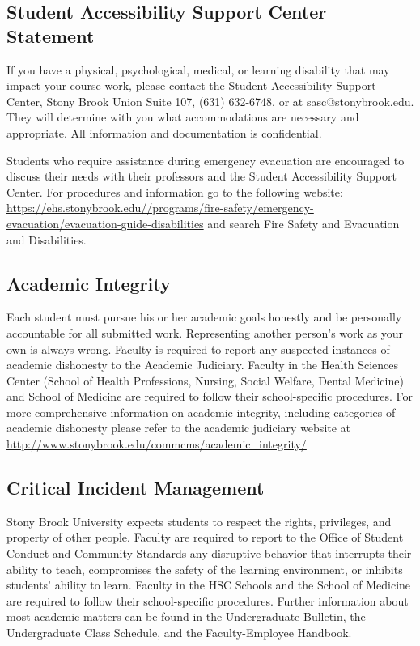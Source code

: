\documentclass[10pt]{article}
\begin{document}
\subsection*{Student Accessibility Support Center Statement}

If you have a physical, psychological, medical, or learning disability
that may impact your course work, please contact the Student
Accessibility Support Center, Stony Brook Union Suite 107, (631)
632-6748, or at sasc@stonybrook.edu. They will determine with you what
accommodations are necessary and appropriate. All information and
documentation is confidential.

Students who require assistance during emergency evacuation are
encouraged to discuss their needs with their professors and the
Student Accessibility Support Center. For procedures and information
go to the following website:\\
{\small \url{https://ehs.stonybrook.edu//programs/fire-safety/emergency-evacuation/evacuation-guide-disabilities}}\linebreak
and search Fire Safety and Evacuation and Disabilities.


\subsection*{Academic Integrity}

Each student must pursue his or her academic goals honestly and be
personally accountable for all submitted work. Representing another
person's work as your own is always wrong. Faculty is required to
report any suspected instances of academic dishonesty to the Academic
Judiciary. Faculty in the Health Sciences Center (School of Health
Professions, Nursing, Social Welfare, Dental Medicine) and School of
Medicine are required to follow their school-specific procedures. For
more comprehensive information on academic integrity, including
categories of academic dishonesty please refer to the academic
judiciary website at\\
{\small \url{http://www.stonybrook.edu/commcms/academic\_integrity/}}


\subsection*{Critical Incident Management}

Stony Brook University expects students to respect the rights,
privileges, and property of other people. Faculty are required to
report to the Office of Student Conduct and Community Standards any
disruptive behavior that interrupts their ability to teach,
compromises the safety of the learning environment, or inhibits
students' ability to learn. Faculty in the HSC Schools and the School
of Medicine are required to follow their school-specific
procedures. Further information about most academic matters can be
found in the Undergraduate Bulletin, the Undergraduate Class Schedule,
and the Faculty-Employee Handbook.
\end{document}
